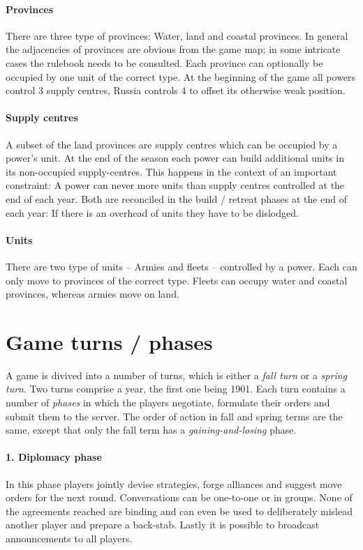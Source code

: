\documentclass[pdftex,12pt,a4paper]{report}
\begin{document}
\paragraph{Provinces}

There are three type of provinces: Water, land and coastal 
provinces. In general the adjacencies of provinces are obvious
from the game map; in some intricate cases the rulebook needs to
be consulted. Each province can optionally be occupied by one
unit of the correct type. At the beginning of the game all powers
control 3 supply centres, Russia controls 4 to offset its
otherwise weak position.

\paragraph{Supply centres}

A subset of the land provinces are supply centres which can be 
occupied by a power's unit. At the end of the season each power
can build additional units in its non-occupied supply-centres.
This happens in the context of an important constraint: A power 
can never more units than supply centres controlled at the end
of each year. Both are reconciled in the build / retreat phases
at the end of each year: If there is an overhead of units they
have to be dislodged.

\paragraph{Units}

There are two type of units -- Armies and fleets -- controlled
by a power. Each can only move to provinces of the correct type.
Fleets can occupy water and coastal provinces, whereas armies 
move on land.

\section{Game turns / phases}

A game is divived into a number of turns, which is either a
\textit{fall turn} or a \textit{spring turn}. Two turns comprise
a year, the first one being 1901. Each turn contains a number of 
\textit{phases} in which the players negotiate, formulate
their orders and submit them to the server. The order of action in
fall and spring terms are the same, except that only the fall term
has a \textit{gaining-and-losing} phase.

\paragraph{1. Diplomacy phase}
In this phase players jointly devise strategies, forge alliances and
suggest move orders for the next round. Conversations can be 
one-to-one or in groups. None of the agreements
reached are binding and can even be used to deliberately 
mislead another player and prepare a back-stab. Lastly it is possible
to broadcast announcements to all players.
\end{document}
